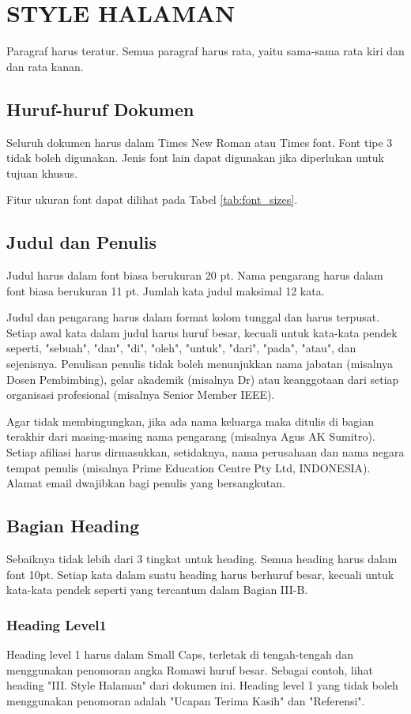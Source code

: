 
\section{\MakeUppercase{Style Halaman}}
Paragraf harus teratur. Semua paragraf harus rata, yaitu sama-sama rata kiri dan dan rata kanan.

\subsection{Huruf-huruf Dokumen}
Seluruh dokumen harus dalam Times New Roman atau Times font. Font tipe 3 tidak boleh digunakan. Jenis font lain dapat digunakan jika diperlukan untuk tujuan khusus.

Fitur ukuran font dapat dilihat pada Tabel \ref{tab:font_sizes}.

\subsection{Judul dan Penulis}
Judul harus dalam font biasa berukuran 20 pt. Nama pengarang harus dalam font biasa berukuran 11 pt. Jumlah kata judul maksimal 12 kata.

Judul dan pengarang harus dalam format kolom tunggal dan harus terpusat. Setiap awal kata dalam judul harus huruf besar, kecuali untuk kata-kata pendek seperti, "sebuah", "dan", "di", "oleh", "untuk", "dari", "pada", "atau", dan sejenisnya. Penulisan penulis tidak boleh menunjukkan nama jabatan (misalnya Dosen Pembimbing), gelar akademik (misalnya Dr) atau keanggotaan dari setiap organisasi profesional (misalnya Senior Member IEEE).

Agar tidak membingungkan, jika ada nama keluarga maka ditulis di bagian terakhir dari masing-masing nama pengarang (misalnya Agus AK Sumitro). Setiap afiliasi harus dirmasukkan, setidaknya, nama perusahaan dan nama negara tempat penulis (misalnya Prime Education Centre Pty Ltd, INDONESIA). Alamat email dwajibkan bagi penulis yang bersangkutan.

\subsection{Bagian Heading}
Sebaiknya tidak lebih dari 3 tingkat untuk heading. Semua heading harus dalam font 10pt. Setiap kata dalam suatu heading harus berhuruf besar, kecuali untuk kata-kata pendek seperti yang tercantum dalam Bagian III-B.

\subsubsection{Heading Level1} Heading level 1 harus dalam Small Caps, terletak di tengah-tengah dan menggunakan penomoran angka Romawi huruf besar. Sebagai contoh, lihat heading "III. Style Halaman" dari dokumen ini. Heading level 1 yang tidak boleh menggunakan penomoran adalah "Ucapan Terima Kasih" dan "Referensi".

